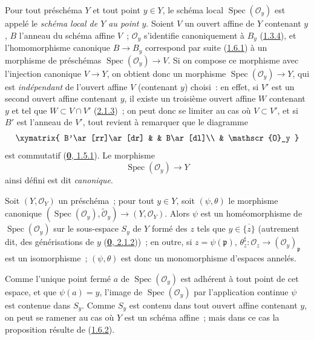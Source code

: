 Pour tout préschéma $Y$ et tout point $y\in Y$, le schéma local
$\operatorname{Spec}(\mathscr{O}_y)$ est appelé le \emph{schéma local de $Y$
au point $y$}. Soient $V$ un ouvert affine de $Y$ contenant $y$, $B$ l'anneau
du schéma affine $V$~; $\mathscr{O}_y$ s'identifie canoniquement à $B_y$
(\hyperref[I.1.3.4-fr]{1.3.4}), et l'homomorphisme canonique $B\to B_y$
correspond par suite (\hyperref[I.1.6.1-fr]{1.6.1}) à un morphisme de
préschémas $\operatorname{Spec}(\mathscr{O}_y)\to V$. Si on compose ce
morphisme avec l'injection canonique $V\to Y$, on obtient donc un morphisme
$\operatorname{Spec}(\mathscr{O}_y)\to Y$, qui est \emph{indépendant} de
l'ouvert affine $V$ (contenant $y$) choisi~: en effet, si $V'$ est un second
ouvert affine contenant $y$, il existe un troisième ouvert affine $W$
contenant $y$ et tel que $W\subset V\cap V'$
(\hyperref[I.2.1.3-fr]{2.1.3})~; on peut donc se limiter au cas où
$V\subset V'$, et si $B'$ est l'anneau de $V'$, tout revient à remarquer que
le diagramme
\label{I.2.4.1.diagram-fr}
\[
  \xymatrix{
    B'\ar[rr]\ar[dr] & & B\ar[dl]\\
    & \mathscr{O}_y
  }
\]
est commutatif (\hyperref[0.1.5.1-fr]{\textbf{0}, 1.5.1}). Le morphisme
\[
  \operatorname{Spec}(\mathscr{O}_y)\to Y
\]
ainsi défini est dit \emph{canonique}.

\begin{proposition}[2.4.2]
\label{I.2.4.2-fr}
Soit $(Y,\mathscr{O}_Y)$ un préschéma~; pour tout $y\in Y$, soit
$(\psi,\theta)$ le morphisme canonique
$(\operatorname{Spec}(\mathscr{O}_y),\widetilde{\mathscr{O}}_y)
\to(Y,\mathscr{O}_Y)$. Alors $\psi$ est un homéomorphisme de
$\operatorname{Spec}(\mathscr{O}_y)$ sur le sous-espace $S_y$ de $Y$ formé
des $z$ tels que $y\in\overline{\{z\}}$ \textup{(autrement dit, des}
générisations \textup{de} $y$ \textup{(\hyperref[0.2.1.2-fr]{\textbf{0}, 2.1.2}))}~; en outre,
si $z=\psi(\mathfrak{p})$,
$\theta_z^{\sharp}:\mathscr{O}_z\to(\mathscr{O}_y)_{\mathfrak{p}}$ est un
isomorphisme~; $(\psi,\theta)$ est donc un monomorphisme d'espaces annelés.
\end{proposition}

Comme l'unique point fermé $a$ de $\operatorname{Spec}(\mathscr{O}_y)$ est
adhérent à tout point de cet espace, et que $\psi(a)=y$, l'image de
$\operatorname{Spec}(\mathscr{O}_y)$ par l'application continue $\psi$ est
contenue dans $S_y$. Comme $S_y$ est contenu dans tout ouvert affine
contenant $y$, on peut se ramener au cas où $Y$ est un schéma affine~; mais
dans ce cas la proposition résulte de
(\hyperref[I.1.6.2-fr]{1.6.2}).

